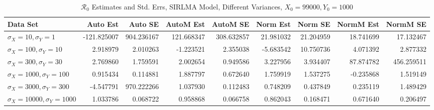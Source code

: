 \documentclass[12pt]{article}
\newcommand{\rr}{\ensuremath{\mathcal{R}_0}}
\begin{document}
\begin{table}[H]
	
	\caption{$\rr$ Estimates and Std. Errs, SIRLMA Model,
		Different Variances, 
		$X_0 = 99000, Y_0 = 1000$}
	\begin{footnotesize}
		\hskip -2cm
		\begin{tabular}{l|r|r|r|r|r|r|r|r}
			\hline
			Data Set & Auto Est & Auto SE & AutoM Est & AutoM SE & Norm Est & Norm SE & NormM Est & NormM SE\\
			\hline
			$\sigma_X = 10, \sigma_Y = 1$ & -121.825007 & 904.236167 & 121.668347 & 308.632857 & 21.981032 & 21.204959 & 18.741699 & 17.132467\\
			\hline
			$\sigma_X = 100, \sigma_Y = 10$ & 2.918979 & 2.010263 & -1.223521 & 2.355038 & -5.683542 & 10.750736 & 4.071392 & 2.877332\\
			\hline
			$\sigma_X = 300, \sigma_Y = 30$ & 2.769860 & 1.759591 & 2.002654 & 0.949586 & 3.227956 & 3.934407 & 87.874782 & 456.259511\\
			\hline
			$\sigma_X = 1000, \sigma_Y = 100$ & 0.915434 & 0.114881 & 1.887797 & 0.672640 & 1.759919 & 1.537275 & -0.235868 & 1.519149\\
			\hline
			$\sigma_X = 3000, \sigma_Y = 300$ & -4.547791 & 970.222266 & 1.037930 & 0.112483 & 0.748209 & 0.437849 & 0.235119 & 1.489429\\
			\hline
			$\sigma_X = 10000, \sigma_Y = 1000$ & 1.033786 & 0.068722 & 0.958868 & 0.066758 & 0.862043 & 0.168471 & 0.671640 & 0.206497\\
			\hline
		\end{tabular}
	\end{footnotesize}
\end{table}
\end{document}
